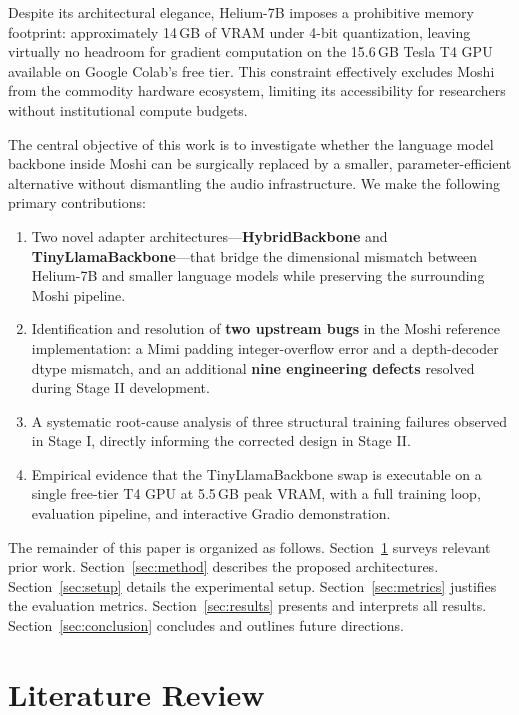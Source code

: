 \documentclass[conference]{IEEEtran}
\begin{document}
Despite its architectural elegance, Helium-7B imposes a prohibitive memory
footprint: approximately 14\,GB of VRAM under 4-bit quantization, leaving
virtually no headroom for gradient computation on the 15.6\,GB Tesla T4 GPU
available on Google Colab's free tier.
This constraint effectively excludes Moshi from the commodity hardware
ecosystem, limiting its accessibility for researchers without institutional
compute budgets.

The central objective of this work is to investigate whether the language model
backbone inside Moshi can be surgically replaced by a smaller, parameter-efficient
alternative without dismantling the audio infrastructure.
We make the following primary contributions:

\begin{enumerate}
  \item Two novel adapter architectures---\textbf{HybridBackbone} and
        \textbf{TinyLlamaBackbone}---that bridge the dimensional mismatch between
        Helium-7B and smaller language models while preserving the surrounding
        Moshi pipeline.
  \item Identification and resolution of \textbf{two upstream bugs} in the
        Moshi reference implementation: a Mimi padding integer-overflow error
        and a depth-decoder dtype mismatch, and an additional \textbf{nine
        engineering defects} resolved during Stage II development.
  \item A systematic root-cause analysis of three structural training failures
        observed in Stage I, directly informing the corrected design in Stage II.
  \item Empirical evidence that the TinyLlamaBackbone swap is executable on a
        single free-tier T4 GPU at 5.5\,GB peak VRAM, with a full training
        loop, evaluation pipeline, and interactive Gradio demonstration.
\end{enumerate}

The remainder of this paper is organized as follows.
Section~\ref{sec:litreview} surveys relevant prior work.
Section~\ref{sec:method} describes the proposed architectures.
Section~\ref{sec:setup} details the experimental setup.
Section~\ref{sec:metrics} justifies the evaluation metrics.
Section~\ref{sec:results} presents and interprets all results.
Section~\ref{sec:conclusion} concludes and outlines future directions.

\section{Literature Review}
\label{sec:litreview}
\end{document}
